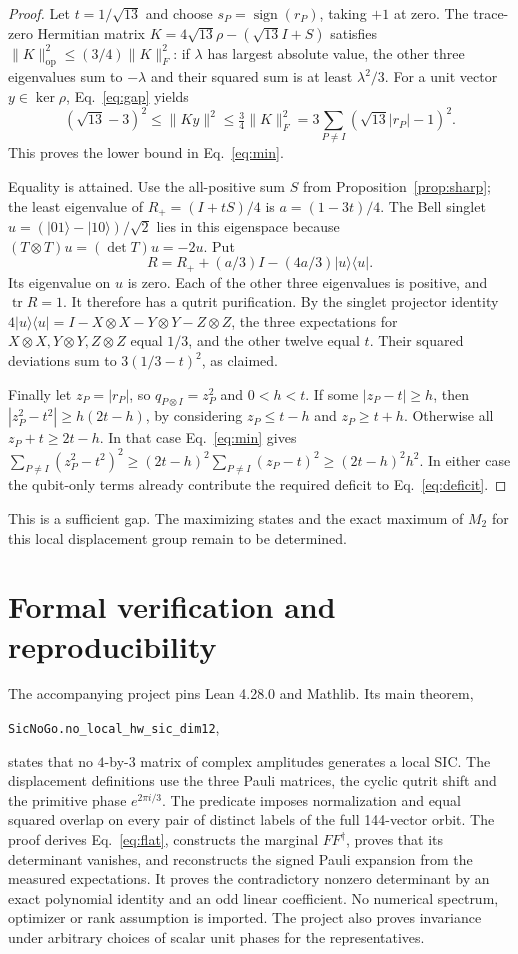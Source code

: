 \documentclass[11pt]{article}
\newcommand{\tr}{\operatorname{tr}}\newcommand{\rank}{\operatorname{rank}}
\begin{document}
\begin{proof}
Let $t=1/\sqrt{13}$ and choose $s_P=\operatorname{sign}(r_P)$, taking $+1$ at zero. The trace-zero Hermitian matrix $K=4\sqrt{13}\rho-(\sqrt{13}I+S)$ satisfies $\|K\|_{\mathrm{op}}^2\leq(3/4)\|K\|_F^2$: if $\lambda$ has largest absolute value, the other three eigenvalues sum to $-\lambda$ and their squared sum is at least $\lambda^2/3$. For a unit vector $y\in\ker\rho$, Eq.~\eqref{eq:gap} yields
\[
 (\sqrt{13}-3)^2\leq\|Ky\|^2\leq\tfrac34\|K\|_F^2
       =3\sum_{P\ne I}(\sqrt{13}|r_P|-1)^2.
\]
This proves the lower bound in Eq.~\eqref{eq:min}.

Equality is attained. Use the all-positive sum $S$ from Proposition~\ref{prop:sharp}; the least eigenvalue of $R_+=(I+tS)/4$ is $a=(1-3t)/4$. The Bell singlet $u=(|01\rangle-|10\rangle)/\sqrt2$ lies in this eigenspace because $(T\otimes T)u=(\det T)u=-2u$. Put
\[
       R=R_++(a/3)I-(4a/3)|u\rangle\langle u|.
\]
Its eigenvalue on $u$ is zero. Each of the other three eigenvalues is positive, and $\tr R=1$. It therefore has a qutrit purification. By the singlet projector identity
$4|u\rangle\langle u|=I-X\otimes X-Y\otimes Y-Z\otimes Z$, the three expectations for $X\otimes X,Y\otimes Y,Z\otimes Z$ equal $1/3$, and the other twelve equal $t$. Their squared deviations sum to $3(1/3-t)^2$, as claimed.

Finally let $z_P=|r_P|$, so $q_{P\otimes I}=z_P^2$ and $0<h<t$. If some $|z_P-t|\ge h$, then $|z_P^2-t^2|\ge h(2t-h)$, by considering $z_P\le t-h$ and $z_P\ge t+h$. Otherwise all $z_P+t\ge2t-h$. In that case Eq.~\eqref{eq:min} gives $\sum_{P\ne I}(z_P^2-t^2)^2\ge(2t-h)^2\sum_{P\ne I}(z_P-t)^2\ge(2t-h)^2h^2$. In either case the qubit-only terms already contribute the required deficit to Eq.~\eqref{eq:deficit}.
\end{proof}
This is a sufficient gap. The maximizing states and the exact maximum of $M_2$ for this local displacement group remain to be determined.

\section{Formal verification and reproducibility}
The accompanying project pins Lean 4.28.0 and Mathlib. Its main theorem,
\begin{center}\texttt{SicNoGo.no\_local\_hw\_sic\_dim12},\end{center}
states that no $4$-by-$3$ matrix of complex amplitudes generates a local SIC. The displacement definitions use the three Pauli matrices, the cyclic qutrit shift and the primitive phase $e^{2\pi i/3}$. The predicate imposes normalization and equal squared overlap on every pair of distinct labels of the full 144-vector orbit. The proof derives Eq.~\eqref{eq:flat}, constructs the marginal $FF^\dagger$, proves that its determinant vanishes, and reconstructs the signed Pauli expansion from the measured expectations. It proves the contradictory nonzero determinant by an exact polynomial identity and an odd linear coefficient. No numerical spectrum, optimizer or rank assumption is imported. The project also proves invariance under arbitrary choices of scalar unit phases for the representatives.
\end{document}

